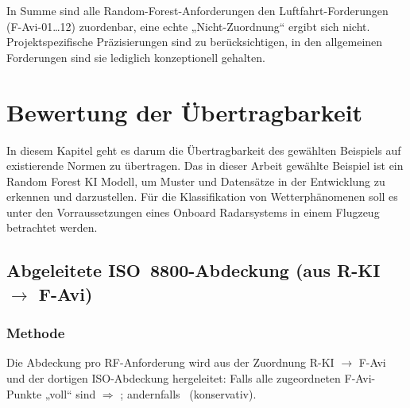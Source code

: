 In Summe sind alle Random-Forest-Anforderungen den Luftfahrt-Forderungen (F-Avi-01…12) zuordenbar, eine echte
„Nicht-Zuordnung“ ergibt sich nicht. Projektspezifische Präzisierungen sind zu berücksichtigen, in den allgemeinen 
Forderungen sind sie lediglich konzeptionell gehalten.







\chapter{Bewertung der Übertragbarkeit}\label{chap:uebertragbarkeit}
In diesem Kapitel geht es darum die Übertragbarkeit des gewählten Beispiels auf existierende Normen zu 
übertragen. Das in dieser Arbeit gewählte Beispiel ist ein Random Forest KI Modell, um 
Muster und Datensätze in der Entwicklung zu erkennen und darzustellen. Für die Klassifikation von  
Wetterphänomenen soll es unter den Vorraussetzungen
eines Onboard Radarsystems in einem Flugzeug betrachtet werden.




\section{Abgeleitete ISO~8800-Abdeckung (aus R-KI \texorpdfstring{$\rightarrow$}{→} F-Avi)}

\subsection*{Methode}
Die Abdeckung pro RF-Anforderung wird aus der Zuordnung R-KI \(\rightarrow\) F-Avi und der dortigen ISO-Abdeckung hergeleitet:
Falls alle zugeordneten F-Avi-Punkte „voll“ sind \(\Rightarrow\) \covV; andernfalls \covT\ (konservativ).

